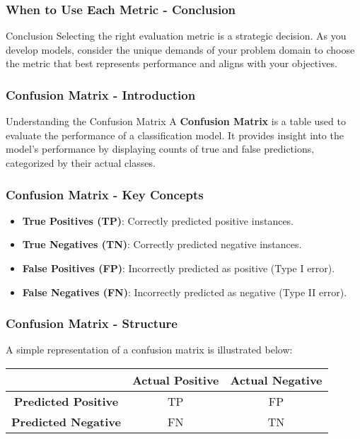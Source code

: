 \documentclass[aspectratio=169]{beamer}
\begin{document}
\begin{frame}[fragile]
    \frametitle{When to Use Each Metric - Conclusion}
    \begin{block}{Conclusion}
        Selecting the right evaluation metric is a strategic decision. As you develop models, consider the unique demands of your problem domain to choose the metric that best represents performance and aligns with your objectives.
    \end{block}
\end{frame}

\begin{frame}[fragile]
    \frametitle{Confusion Matrix - Introduction}
    \begin{block}{Understanding the Confusion Matrix}
        A \textbf{Confusion Matrix} is a table used to evaluate the performance of a classification model. It provides insight into the model's performance by displaying counts of true and false predictions, categorized by their actual classes.
    \end{block}
\end{frame}

\begin{frame}[fragile]
    \frametitle{Confusion Matrix - Key Concepts}
    \begin{itemize}
        \item \textbf{True Positives (TP)}: Correctly predicted positive instances.
        \item \textbf{True Negatives (TN)}: Correctly predicted negative instances.
        \item \textbf{False Positives (FP)}: Incorrectly predicted as positive (Type I error).
        \item \textbf{False Negatives (FN)}: Incorrectly predicted as negative (Type II error).
    \end{itemize}
\end{frame}

\begin{frame}[fragile]
    \frametitle{Confusion Matrix - Structure}
    A simple representation of a confusion matrix is illustrated below:

    \begin{center}
        \begin{tabular}{|c|c|c|}
            \hline
            & \textbf{Actual Positive} & \textbf{Actual Negative} \\
            \hline
            \textbf{Predicted Positive} & TP & FP \\
            \hline
            \textbf{Predicted Negative} & FN & TN \\
            \hline
        \end{tabular}
    \end{center}
\end{frame}
\end{document}

